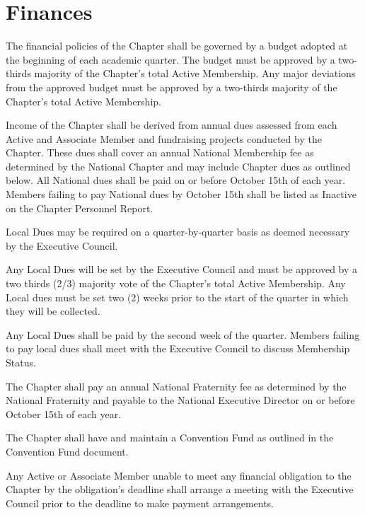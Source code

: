 \documentclass[11pt]{article}
\begin{document}
\section{Finances}
\begin{legal}
  \item
    The financial policies of the Chapter shall be governed by a budget adopted at the beginning of each academic quarter.
    The budget must be approved by a two-thirds majority of the Chapter’s total Active Membership.
    Any major deviations from the approved budget must be approved by a two-thirds majority of the Chapter’s total Active Membership.
  \item
    Income of the Chapter shall be derived from annual dues assessed from each Active and Associate Member and fundraising projects conducted by the Chapter.
    These dues shall cover an annual National Membership fee as determined by the National Chapter and may include Chapter dues as outlined below.
    All National dues shall be paid on or before October 15th of each year.
    Members failing to pay National dues by October 15th shall be listed as Inactive on the Chapter Personnel Report.
    \begin{legal}
      \item
        Local Dues may be required on a quarter-by-quarter basis as deemed necessary by the Executive Council.
      \item
        Any Local Dues will be set by the Executive Council and must be approved by a two thirds (2/3) majority vote of the Chapter’s total Active Membership.
        Any Local dues must be set two (2) weeks prior to the start of the quarter in which they will be collected.
      \item
        Any Local Dues shall be paid by the second week of the quarter.
        Members failing to pay local dues shall meet with the Executive Council to discuss Membership Status.
    \end{legal}
  \item
    The Chapter shall pay an annual National Fraternity fee as determined by the National Fraternity and payable to the National Executive Director on or before October 15th of each year.
  \item
    The Chapter shall have and maintain a Convention Fund as outlined in the Convention Fund document.
  \item
    Any Active or Associate Member unable to meet any financial obligation to the Chapter by the obligation’s deadline shall arrange a meeting with the Executive Council prior to the deadline to make payment arrangements.
\end{legal}
\end{document}
